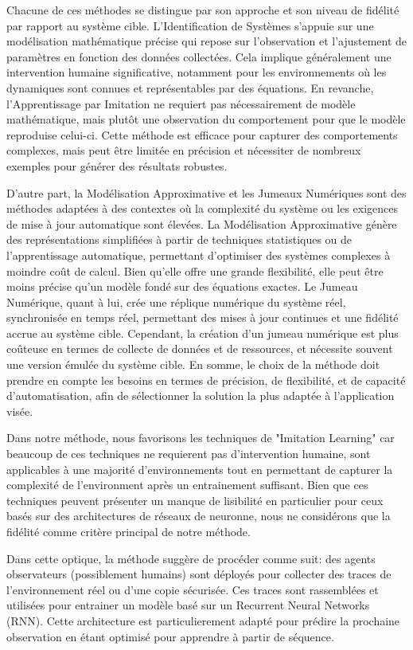 \documentclass[sigconf,anonymous]{aamas}
\begin{document}
Chacune de ces méthodes se distingue par son approche et son niveau de fidélité par rapport au système cible. L'Identification de Systèmes s'appuie sur une modélisation mathématique précise qui repose sur l'observation et l'ajustement de paramètres en fonction des données collectées. Cela implique généralement une intervention humaine significative, notamment pour les environnements où les dynamiques sont connues et représentables par des équations. En revanche, l'Apprentissage par Imitation ne requiert pas nécessairement de modèle mathématique, mais plutôt une observation du comportement pour que le modèle reproduise celui-ci. Cette méthode est efficace pour capturer des comportements complexes, mais peut être limitée en précision et nécessiter de nombreux exemples pour générer des résultats robustes.

D'autre part, la Modélisation Approximative et les Jumeaux Numériques sont des méthodes adaptées à des contextes où la complexité du système ou les exigences de mise à jour automatique sont élevées. La Modélisation Approximative génère des représentations simplifiées à partir de techniques statistiques ou de l'apprentissage automatique, permettant d'optimiser des systèmes complexes à moindre coût de calcul. Bien qu'elle offre une grande flexibilité, elle peut être moins précise qu'un modèle fondé sur des équations exactes. Le Jumeau Numérique, quant à lui, crée une réplique numérique du système réel, synchronisée en temps réel, permettant des mises à jour continues et une fidélité accrue au système cible. Cependant, la création d'un jumeau numérique est plus coûteuse en termes de collecte de données et de ressources, et nécessite souvent une version émulée du système cible. En somme, le choix de la méthode doit prendre en compte les besoins en termes de précision, de flexibilité, et de capacité d'automatisation, afin de sélectionner la solution la plus adaptée à l'application visée.

Dans notre méthode, nous favorisons les techniques de "Imitation Learning" car beaucoup de ces techniques ne requierent pas d'intervention humaine, sont applicables à une majorité d'environnements tout en permettant de capturer la complexité de l'environment après un entrainement suffisant. Bien que ces techniques peuvent présenter un manque de lisibilité en particulier pour ceux basés sur des architectures de réseaux de neuronne, nous ne considérons que la fidélité comme critère principal de notre méthode.

Dans cette optique, la méthode suggère de procéder comme suit: des agents observateurs (possiblement humains) sont déployés pour collecter des traces de l'environnement réel ou d'une copie sécurisée. Ces traces sont rassemblées et utilisées pour entrainer un modèle basé sur un Recurrent Neural Networks (RNN). Cette architecture est particulierement adapté pour prédire la prochaine observation en étant optimisé pour apprendre à partir de séquence.
\end{document}
